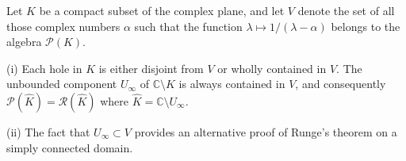 Let $K$ be a compact subset of the complex plane, and let $V$ denote the set of all those complex numbers $\alpha$ such that the function $\lambda \mapsto 1/(\lambda - \alpha)$ belongs to the algebra $\mathcal{P}(K)$.

(i) Each hole in $K$ is either disjoint from $V$ or wholly contained in $V$. The unbounded component $U_{\infty}$ of $\mathbb{C} \setminus K$ is always contained in $V$, and consequently $\mathcal{P}(\hat{K}) = \mathcal{R}(\hat{K})$ where $\hat{K} = \mathbb{C} \setminus U_{\infty}$.

(ii) The fact that $U_{\infty} \subset V$ provides an alternative proof of Runge's theorem on a simply connected domain.
